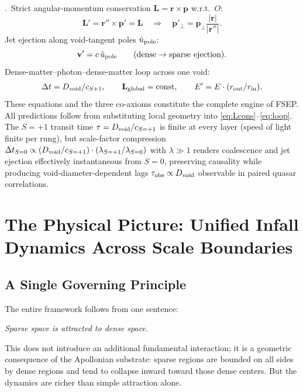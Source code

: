 \documentclass[11pt,letterpaper]{article}
\begin{document}
.\ Strict angular-momentum conservation
$\mathbf{L}=\mathbf{r}\times\mathbf{p}$ w.r.t.\ $O$:
\begin{equation}
\mathbf{L}'=\mathbf{r}''\times\mathbf{p}'=\mathbf{L}
\quad\Rightarrow\quad
\mathbf{p}'_\perp=\mathbf{p}_\perp\frac{|\mathbf{r}|}{|\mathbf{r}''|}.
\label{eq:Lcons}
\end{equation}
Jet ejection along void-tangent poles $\hat{u}_{\rm pole}$:
\begin{equation}
\mathbf{v}'=c\,\hat{u}_{\rm pole}\qquad(\text{dense}\to\text{sparse ejection}).
\end{equation}
Dense-matter--photon--dense-matter loop across one void:
\begin{align}
\Delta t=D_{\rm void}/c_{S+1},\qquad
\mathbf{L}_{\rm global}=\text{const},\qquad
E'=E\cdot(r_{\rm out}/r_{\rm in}).
\label{eq:loop}
\end{align}
These equations and the three co-axioms constitute the complete engine of FSEP.
All predictions follow from substituting local geometry into
\eqref{eq:Lcons}--\eqref{eq:loop}. The $S{=}+1$ transit time
$\tau=D_{\rm void}/c_{S{=}+1}$ is finite at every layer (speed of light finite per
rung), but scale-factor compression
$\Delta t_{S=0}\propto(D_{\rm void}/c_{S{=}+1})\cdot
(\lambda_{S{=}+1}/\lambda_{S=0})$ with $\lambda\gg1$ renders coalescence and jet
ejection effectively instantaneous from $S{=}0$, preserving causality while
producing void-diameter-dependent lags $\tau_{\rm obs}\propto D_{\rm void}$
observable in paired quasar correlations.

\section{The Physical Picture: Unified Infall Dynamics Across Scale Boundaries}
\label{sec:picture}

\subsection{A Single Governing Principle}
The entire framework follows from one sentence:
\begin{center}
\textit{Sparse space is attracted to dense space.}
\end{center}
This does not introduce an additional fundamental interaction; it is a geometric
consequence of the Apollonian substrate: sparse regions are bounded on all sides by
dense regions and tend to collapse inward toward those dense centers. But the
dynamics are richer than simple attraction alone.
\end{document}
